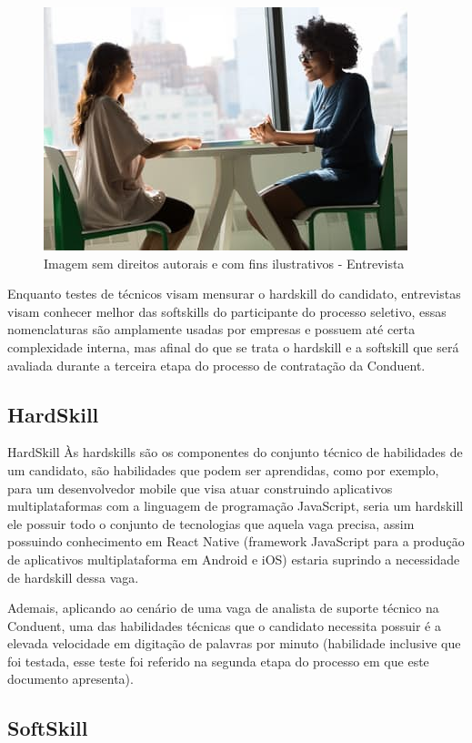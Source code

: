 \documentclass[12pt]{article}
\begin{document}
\begin{figure}[h]
	\centering
	\includegraphics[scale=0.7]{build/images/interview.jpeg}
	\caption{Imagem sem direitos autorais e com fins ilustrativos - Entrevista}
\end{figure}
Enquanto testes de técnicos visam mensurar o hardskill do candidato, entrevistas visam conhecer melhor das softskills do participante do processo seletivo, essas nomenclaturas são amplamente usadas por empresas e possuem até certa complexidade interna, mas afinal do que se trata o hardskill e a softskill que será avaliada durante a terceira etapa do processo de contratação da Conduent.

\subsection{HardSkill}
HardSkill
Às hardskills são os componentes do conjunto técnico de habilidades de um candidato, são habilidades que podem ser aprendidas, como por exemplo, para um desenvolvedor mobile que visa atuar construindo aplicativos multiplataformas com a linguagem de programação JavaScript, seria um hardskill ele possuir todo o conjunto de tecnologias que aquela vaga precisa, assim possuindo conhecimento em React Native (framework JavaScript para a produção de aplicativos multiplataforma em Android e iOS) estaria suprindo a necessidade de hardskill dessa vaga. 

Ademais, aplicando ao cenário de uma vaga de analista de suporte técnico na Conduent, uma das habilidades técnicas que o candidato necessita possuir é a elevada velocidade em digitação de palavras por minuto (habilidade inclusive que foi testada, esse teste foi referido na segunda etapa do processo em que este documento apresenta).

\subsection{SoftSkill}
\end{document}
